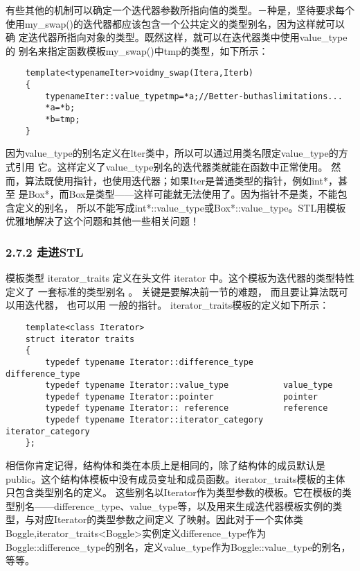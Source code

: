 有些其他的机制可以确定一个迭代器参数所指向值的类型。－种是，坚待要求每个
使用my\_swap()的迭代器都应该包含一个公共定义的类型别名，因为这样就可以确
定迭代器所指向对象的类型。既然这样，就可以在迭代器类中使用value\_type的
别名来指定函数模板my\_swap()中tmp的类型，如下所示：


\begin{verbatim}
	template<typenameIter>voidmy_swap(Itera,Iterb)
	{
		typenameIter::value_typetmp=*a;//Better-buthaslimitations...
		*a=*b;
		*b=tmp;
	}
\end{verbatim}


因为value\_type的别名定义在lter类中，所以可以通过用类名限定value\_type的方式引用
它。这样定义了value\_type别名的迭代器类就能在函数中正常使用。
然而，算法既使用指针，也使用迭代器；如果Iter是普通类型的指针，例如int*，甚至
是Box*，而Box是类型——这样可能就无法使用了。因为指针不是类，不能包含定义的别名，
所以不能写成int*::value\_type或Box*::value\_type。STL用模板优雅地解决了这个问题和其他一些相关问题！
\subsubsection{2.7.2 走进STL}
模板类型 iterator\_traits 定义在头文件 iterator 中。这个模板为迭代器的类型特性定义了
一套标准的类型别名 。 关键是要解决前一节的难题， 而且要让算法既可以用迭代器，
也可以用 一般的指针。 iterator\_traits模板的定义如下所示：



\begin{verbatim}
	template<class Iterator> 
	struct iterator traits 
	{
		typedef typename Iterator::difference_type	 	difference_type
		typedef typename Iterator::value_type			value_type
		typedef typename Iterator::pointer				pointer
		typedef typename Iterator:: reference			reference
		typedef typename Iterator::iterator_category 	iterator_category 
	};
\end{verbatim}
相信你肯定记得，结构体和类在本质上是相同的，除了结构体的成员默认是public。这个结构体模板中没有成员变址和成员函数。iterator\_traits模板的主体只包含类型别名的定义。
这些别名以Iterator作为类型参数的模板。它在模板的类型别名——difference\_type、value\_type等，以及用来生成迭代器模板实例的类型，与对应Iterator的类型参数之间定义
了映射。因此对于一个实体类Boggle,iterator\_traits<Boggle>实例定义difference\_type作为Boggle::difference\_type的别名，定义value\_type作为Boggle::value\_type的别名，等等。

